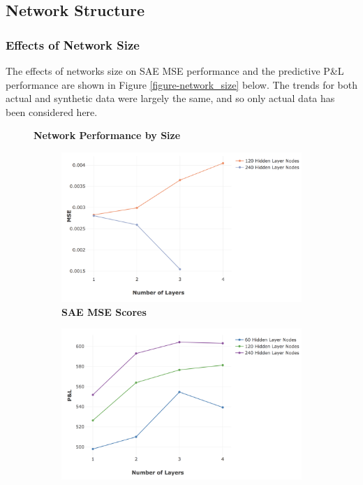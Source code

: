 \documentclass[a4paper,11pt,oneside]{article}
\theoremstyle{plain}
\theoremstyle{definition}
\begin{document}
	\newpage

	\subsection{Network Structure}\label{results_network}
	
	\subsubsection{Effects of Network Size}
	
	The effects of networks size on SAE MSE performance and the predictive P\&L performance are shown in Figure \ref{figure-network_size} below. The trends for both actual and synthetic data were largely the same, and so only actual data has been considered here.
	
	\begin{figure}[H]
		\centering
		\textbf{Network Performance by Size}
		\begin{subfigure}{.5\textwidth}
			\centering 
			\includegraphics[scale=0.25]{images/results/network/actual_mse_lines.png}
			\caption{\textbf{SAE MSE Scores} 
				\newline }
			\label{figure-actual_mse_lines}
		\end{subfigure}%
		\begin{subfigure}{.5\textwidth}
			\centering 
			\includegraphics[scale=0.26]{images/results/network/actual_pl_lines.png}

\end{subfigure}
\end{figure}
\end{document}
